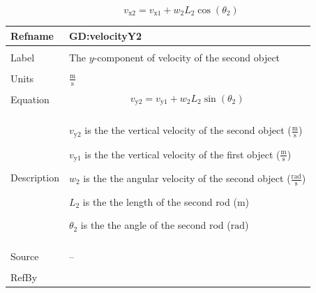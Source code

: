 \documentclass[12pt]{article}
\begin{document}
\begin{displaymath}
{v_{\text{x}2}}={v_{\text{x}1}}+{w_{2}} {L_{2}} \cos\left({θ_{2}}\right)
\end{displaymath}
\vspace{\baselineskip}
\noindent
\begin{minipage}{\textwidth}
\begin{tabular}{>{\raggedright}p{}>{\raggedright\arraybackslash}p{}}
\toprule \textbf{Refname} & \textbf{GD:velocityY2}
\label{GD:velocityY2}
\\ \midrule \\
Label & The $y$-component of velocity of the second object
        
\\ \midrule \\
Units & $\frac{\text{m}}{\text{s}}$
        
\\ \midrule \\
Equation & \begin{displaymath}
           {v_{\text{y}2}}={v_{\text{y}1}}+{w_{2}} {L_{2}} \sin\left({θ_{2}}\right)
           \end{displaymath}
\\ \midrule \\
Description & \begin{symbDescription}
              \item{${v_{\text{y}2}}$ is the the vertical velocity of the second object ($\frac{\text{m}}{\text{s}}$)}
              \item{${v_{\text{y}1}}$ is the the vertical velocity of the first object ($\frac{\text{m}}{\text{s}}$)}
              \item{${w_{2}}$ is the the angular velocity of the second object ($\frac{\text{rad}}{\text{s}}$)}
              \item{${L_{2}}$ is the the length of the second rod (${\text{m}}$)}
              \item{${θ_{2}}$ is the the angle of the second rod (${\text{rad}}$)}
              \end{symbDescription}
\\ \midrule \\
Source & --
         
\\ \midrule \\
RefBy & 
\\ \bottomrule
\end{tabular}
\end{minipage}
\end{document}
